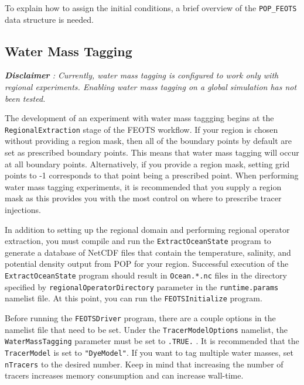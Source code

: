\documentclass{softwaremanual}
\begin{document}
To explain how to assign the initial conditions, a brief overview of the \texttt{POP\_FEOTS} data structure is needed.
 
 

\subsection{Water Mass Tagging}
 \textit{\textbf{Disclaimer} : Currently, water mass tagging is configured to work only with regional experiments. Enabling water mass tagging on a global simulation has not been tested.}
 
The development of an experiment with water mass taggging begins at the \texttt{RegionalExtraction} stage of the FEOTS workflow. If your region is chosen without providing a region mask, then all of the boundary points by default are set as prescribed boundary points. This means that water mass tagging will occur at all boundary points. Alternatively, if you provide a region mask, setting grid points to -1 corresponds to that point being a prescribed point. When performing water mass tagging experiments, it is recommended that you supply a region mask as this provides you with the most control on where to prescribe tracer injections.

 
In addition to setting up the regional domain and performing regional operator extraction, you must compile and run the \texttt{ExtractOceanState} program to generate a database of NetCDF files that contain the temperature, salinity, and potential density output from POP for your region. Successful execution of the \texttt{ExtractOceanState} program should result in \texttt{Ocean.*.nc} files in the directory specified by \texttt{regionalOperatorDirectory} parameter in the \texttt{runtime.params} namelist file. At this point, you can run the \texttt{FEOTSInitialize} program.

Before running the \texttt{FEOTSDriver} program, there are a couple options in the namelist file that need to be set. Under the \texttt{TracerModelOptions} namelist, the \texttt{WaterMassTagging} parameter must be set to \texttt{.TRUE.} . It is recommended that the \texttt{TracerModel} is set to \texttt{"DyeModel"}. If you want to tag multiple water masses, set \texttt{nTracers} to the desired number. Keep in mind that increasing the number of tracers increases memory consumption and can increase wall-time. 
\end{document}
